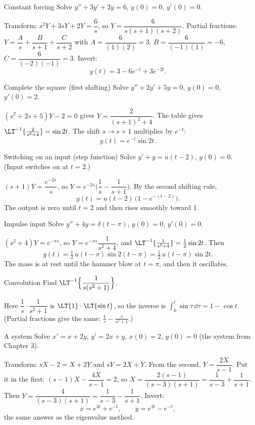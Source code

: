 \begin{examplebox}{Constant forcing}
Solve $y'' + 3y' + 2y = 6$, \; $y(0)=0$, \; $y'(0)=0$.

Transform: $s^2Y + 3sY + 2Y = \dfrac6s$, so $Y = \dfrac{6}{s(s+1)(s+2)}$. Partial fractions: $Y = \dfrac{A}{s} + \dfrac{B}{s+1} + \dfrac{C}{s+2}$ with $A = \dfrac{6}{(1)(2)} = 3$, $B = \dfrac{6}{(-1)(1)} = -6$, $C = \dfrac{6}{(-2)(-1)} = 3$. Invert:
\[ y(t) = 3 - 6e^{-t} + 3e^{-2t}. \]
\end{examplebox}

\begin{examplebox}{Complete the square (first shifting)}
Solve $y'' + 2y' + 5y = 0$, \; $y(0) = 0$, \; $y'(0)=2$.

$(s^2 + 2s + 5)Y - 2 = 0$ gives $Y = \dfrac{2}{(s+1)^2 + 4}$. The table gives $\LT^{-1}\{\frac{2}{s^2+4}\} = \sin 2t$. The shift $s\to s+1$ multiplies by $e^{-t}$:
\[ y(t) = e^{-t}\sin 2t. \]
\end{examplebox}

\begin{examplebox}{Switching on an input (step function)}
Solve $y' + y = u(t-2)$, \; $y(0)=0$. (Input switches on at $t=2$.)

$(s+1)Y = \dfrac{e^{-2s}}{s}$, so $Y = e^{-2s}\Big(\dfrac1s - \dfrac1{s+1}\Big)$. By the second shifting rule,
\[ y(t) = u(t-2)\,\big(1 - e^{-(t-2)}\big). \]
The output is zero until $t=2$ and then rises smoothly toward 1.
\end{examplebox}

\begin{examplebox}{Impulse input}
Solve $y'' + 4y = \delta(t - \pi)$, \; $y(0)=0$, \; $y'(0)=0$.

$(s^2+4)Y = e^{-\pi s}$, so $Y = e^{-\pi s}\dfrac{1}{s^2+4}$, and $\LT^{-1}\{\frac{1}{s^2+4}\} = \tfrac12\sin 2t$. Then
\[ y(t) = \tfrac12\,u(t-\pi)\sin 2(t-\pi) = \tfrac12\,u(t-\pi)\sin 2t . \]
The mass is at rest until the hammer blow at $t=\pi$, and then it oscillates.
\end{examplebox}

\begin{examplebox}{Convolution}
Find $\LT^{-1}\Big\{\dfrac{1}{s(s^2+1)}\Big\}$.

Here $\dfrac1s\cdot\dfrac1{s^2+1}$ is $\LT\{1\}\cdot\LT\{\sin t\}$, so the inverse is $\displaystyle\int_0^t \sin\tau\,\dd\tau = 1 - \cos t$. (Partial fractions give the same: $\frac1s - \frac{s}{s^2+1}$.)
\end{examplebox}

\begin{examplebox}{A system}
Solve $x' = x + 2y$, \; $y' = 2x + y$, \; $x(0)=2$, \; $y(0)=0$ (the system from Chapter 3).

Transform: $sX - 2 = X + 2Y$ and $sY = 2X + Y$. From the second, $Y = \dfrac{2X}{s-1}$. Put it in the first: $(s-1)X - \dfrac{4X}{s-1} = 2$, so $X = \dfrac{2(s-1)}{(s-3)(s+1)} = \dfrac{1}{s-3} + \dfrac{1}{s+1}$. Then $Y = \dfrac{4}{(s-3)(s+1)} = \dfrac{1}{s-3} - \dfrac{1}{s+1}$. Invert:
\[ x = e^{3t} + e^{-t}, \qquad y = e^{3t} - e^{-t}, \]
the same answer as the eigenvalue method.
\end{examplebox}

